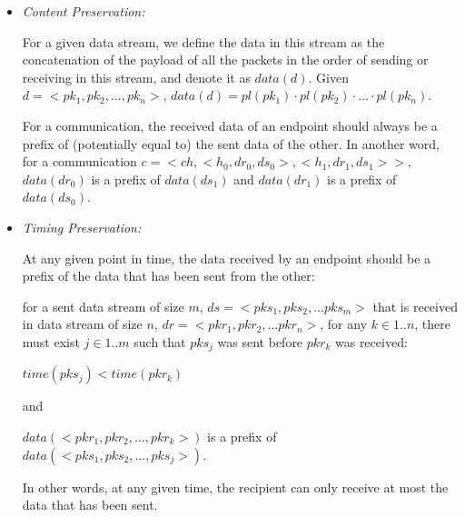 \begin{itemize}
 \item \textit{Content Preservation:} 
 
 For a given data stream, we define the data in this stream as the concatenation of the payload of all the packets in the order of sending or receiving in this stream, and denote it as $data(d)$. Given $ d=<pk_1, pk_2, ..., pk_n>$, $data(d)=pl(pk_1) \cdot pl(pk_2)\cdot \ldots \cdot pl(pk_n)$.
 
 For a communication, the received data of an endpoint should always be a prefix of (potentially equal to) the sent data of the other. In another word, for a communication $c = <ch, <h_0, dr_0, ds_0>, <h_1, dr_1, ds_1>>$,$data(dr_0)$ is a prefix of $data(ds_1)$ and $data(dr_1)$ is a prefix of $data(ds_0)$.
 

 \item \textit{Timing Preservation:} 
 
At any given point in time, the data received by an endpoint should be a prefix of the data that has been sent from the other:
 
for a sent data stream of size $m$, $ds= <pks_1, pks_2, ... pks_m>$ that is received in data stream of size $n$, $dr = <pkr_1, pkr_2, ... pkr_n>$, for any $k \in {1..n}$, there must exist $j \in {1..m}$ such that $pks_j$ was sent before $pkr_k$ was received:

$time(pks_j) < time(pkr_k)$

and

$ data(<pkr_1, pkr_2, ..., pkr_k>)$ is a prefix of $data(<pks_1, pks_2, ..., pks_j>)$.

In other words, at any given time, the recipient can only receive at most the data that has been sent.

\end{itemize}

